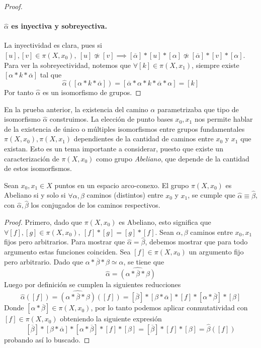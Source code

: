{\begin{proof}
  \paragraph{\(\hat \alpha\) es inyectiva y sobreyectiva.} La inyectividad es
  clara, pues si \([u],[v] \in \pi (X, x_0),\ [u] \not \simeq [v]
  \implies [\overline{\alpha}] * [u] * [\alpha] \not \simeq
    [\overline{\alpha}] * [v]
  * [\alpha]\). Para ver la sobreyectividad, notemos que \(\forall [k] \in
  \pi (X, x_1) \), siempre existe \( [\alpha * k * \overline{\alpha}]\) tal
  que
  \[ \hat \alpha ([\alpha * k * \overline{\alpha}]) = [\overline{\alpha}
    * \alpha * k * \overline{\alpha} * \alpha] = [k]\]
  Por tanto \(\hat \alpha\) es un isomorfismo de grupos.
\end{proof}
En la prueba anterior, la existencia del camino \(\alpha\)
parametrizaba que tipo de isomorfismo \(\hat \alpha\) construimos.
La elección de punto bases
\(x_0, x_1\) nos permite hablar de la existencia de único o múltiples
isomorfismos entre grupos fundamentales \(\pi (X, x_0), \pi (X, x_1) \)
dependientes de la cantidad de caminos entre \(x_0\) y \(x_1\) que
existan. Esto es un tema importante a considerar, puesto que existe un
caracterización de \(\pi (X, x_0) \) como grupo \emph{Abeliano}, que depende de
la cantidad de estos isomorfismos.
\begin{teorema}
  Sean \(x_0, x_1 \in X\) puntos en un espacio arco-conexo. El grupo
  \(\pi (X, x_0) \) es Abeliano si y solo si \(\forall \alpha, \beta\)
  caminos (distintos) entre \(x_0\) y \(x_1\), se cumple que \(\hat \alpha \equiv
  \hat \beta\), con \(\hat \alpha, \hat \beta\) los conjugados de los
  caminos respectivos.
\end{teorema}
\begin{proof}
  Primero, dado que \(\pi (X, x_0)\) es
  Abeliano, esto significa que \(\forall [f],[g] \in \pi (X, x_0),\ [f]
  * [g] = [g] * [f]\). Sean \(\alpha, \beta\) caminos entre \(x_0,x_1\)
  fijos pero arbitrarios. Para mostrar que \( \hat \alpha = \hat \beta\),
  debemos mostrar que para todo argumento estas funciones coinciden. Sea
  \([f] \in \pi (X, x_0) \) un argumento fijo pero arbitrario. Dado que
  \(\alpha * \overline{\beta} * \beta \simeq \alpha \), se tiene que
  \[ \hat \alpha = \widehat{(\alpha * \overline{\beta} * \beta)}\]
  Luego por definición se cumplen la siguientes reducciones
  \[ \hat \alpha ([f]) = \widehat{(\alpha * \overline{\beta} * \beta)} ([f]) =
    [\overline{\beta}] * [\beta * \overline{\alpha}] * [f] * [\alpha *
    \overline{\beta}] * [\beta]
  \]
  Donde \([\alpha * \overline{\beta}] \in \pi (X, x_0) \), por lo tanto
  podemos aplicar conmutatividad con \([f] \in \pi (X,x_0)\) obteniendo la
  siguiente expresión
  \[
    [\overline{\beta}] * [\beta * \overline{\alpha}] * [\alpha *
    \overline{\beta}] * [f] * [\beta] = [\overline{\beta}] * [f] * [\beta] =
    \hat \beta ([f])
  \]
  probando así lo buscado.


\end{proof}}
